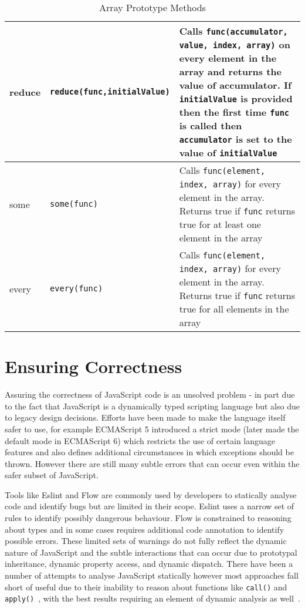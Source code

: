 \documentclass[]{final_report}
\begin{document}
\begin{table}[h]
\begin{tabular}{|p{2cm}|p{4.2cm}|p{9cm} |}
reduce & {\lstinline|reduce(func,initialValue)|} & Calls {\lstinline|func(accumulator, value, index, array)|} on every element in the array and returns the value of accumulator. If {\lstinline|initialValue|} is provided then the first time {\lstinline|func|} is called then {\lstinline|accumulator|} is set to the value of {\lstinline|initialValue|} \\ \hline
some & {\lstinline|some(func)|} & Calls {\lstinline|func(element, index, array)|} for every element in the array. Returns true if {\lstinline|func|} returns true for at least one element in the array \\ \hline
every & {\lstinline|every(func)|} & Calls {\lstinline|func(element, index, array)|} for every element in the array. Returns true if {\lstinline|func|} returns true for all elements in the array \\ \hline
\end{tabular}
\caption{Array Prototype Methods}
\label{table:array-prototype}
\end{table}


\section{Ensuring Correctness}
Assuring the correctness of JavaScript code is an unsolved problem - in part due to the fact that JavaScript is a dynamically typed scripting language but also due to legacy design decisions. Efforts have been made to make the language itself safer to use, for example ECMAScript 5 introduced a strict mode (later made the default mode in ECMAScript 6) which restricts the use of certain language features and also defines additional circumstances in which exceptions should be thrown. However there are still many subtle errors that can occur even within the safer subset of JavaScript.

Tools like Eslint and Flow are commonly used by developers to statically analyse code and identify bugs but are limited in their scope. Eslint uses a narrow set of rules to identify possibly dangerous behaviour. Flow is constrained to reasoning about types and in some cases requires additional code annotation to identify possible errors. These limited sets of warnings do not fully reflect the dynamic nature of JavaScript and the subtle interactions that can occur due to prototypal inheritance, dynamic property access, and dynamic dispatch. There have been a number of attempts to analyse JavaScript statically however most approaches fall short of useful due to their inability to reason about functions like \lstinline{call()} and \lstinline{apply()}~\cite{sridharan2012correlation}, with the best results requiring an element of dynamic analysis as well~\cite{logozzo2010rata, wei2013practical}.
\end{document}
